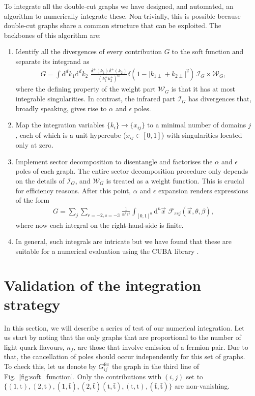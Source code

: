 \documentclass{appolb}
\newcommand{\dd}{\text{d}}
\newcommand{\txt}{\text{t} }
\newcommand{\txtb}{\bar{\text{t}} }
\begin{document}
To integrate all the double-cut graphs we have designed, and automated, an algorithm to numerically integrate these. Non-trivially, this is possible because double-cut graphs share a common structure that can be exploited. The backbones of this algorithm are:
\begin{enumerate}
\item Identify all the divergences of every contribution  $G$ to the soft function and separate its integrand as 
 \begin{align}
G=  \int   \dd^d k_1 \dd^d k_2\, \, \frac{\delta^{+}(k_1)  \delta^{+}(k_2)} {(k_1^{+} k_2^+)^\alpha} 
\delta\left(1-|k_{1\perp}+k_{2\perp}|^2\right) \,  \mathcal{I}_G\times  \mathcal{W}_G, 
\end{align}
where the defining property of the weight part $\mathcal{W}_G$ is that it has at most integrable singularities. In contrast,  the infrared part $\mathcal{I}_G$ has divergences that, broadly speaking, gives rise to $\alpha$ and $\epsilon$ poles. 
\item Map the integration variables $\{k_i\}\to \{x_{ij}\}$ to a minimal number of domains $j$, each of which is a  unit hypercube ($x_{ij}\in [0,1]$) with singularities located only at zero. 
\item Implement sector decomposition to disentangle and factorises the 
$\alpha$ and $\epsilon$ poles of each graph. The entire sector decomposition procedure only depends on the details of  $\mathcal{I}_G$, and   $\mathcal{W}_G$ is treated as a weight function. This is crucial for efficiency reasons. After this point, $\alpha$ and $\epsilon$ expansion renders expressions of the form 
\begin{align}
G =\sum_j \sum_{r=-2,s=-3} \frac{1}{\alpha^r \epsilon^s}
 \int_{[0,1]^n} \dd^{n} \vec{x}\,\,  \mathcal{F}_{rsj} (\vec{x},\theta,\beta) ,
\end{align}
where now each integral on the right-hand-side is finite.
\item In general, such integrals are intricate but we have found that these are suitable for a numerical evaluation
using the CUBA library \cite{Hahn:2004fe}.
\end{enumerate}

\section{Validation of the integration strategy\label{sec:validation} }

In this section, we will describe a series of test of our numerical integration. 
Let us start by noting that the only graphs that are proportional to the number of light quark flavours, $n_f$, are those that involve emission of a fermion pair. Due to that, the cancellation of poles should occur independently for this set of graphs. To check this, let us denote by $G^{\text{fer}}_{ij}$ the graph in the third line of Fig.~\ref{fig:soft_function}. Only the contributions with $(i,j)$ set to   $\{(1,\txt),(2,\txt) ,(1,\txtb),(2,\txtb)
(\txt,\txtb), (\txt,\txt),  (\txtb,\txtb) \}$ are non-vanishing.
\end{document}
